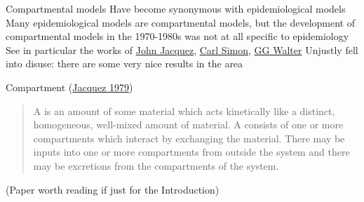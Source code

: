 \documentclass[aspectratio=169]{beamer}\usepackage[]{graphicx}\usepackage[]{xcolor}
\begin{document}
\begin{frame}{Compartmental models}
\bbullet Have become synonymous with epidemiological models
\vfill
\bbullet Many epidemiological models are compartmental models, but the development of compartmental models in the 1970-1980s was not at all specific to epidemiology
\vfill
\bbullet See in particular the works of \href{https://www.semanticscholar.org/author/J.-Jacquez/2321059}{John Jacquez}, \href{https://scholar.google.ca/citations?user=dv_z_mAAAAAJ}{Carl Simon}, \href{https://www.semanticscholar.org/author/G.-Walter/1799059}{GG Walter} \nocite{JacquezSimon1993}
\vfill
\bbullet Unjustly fell into disuse: there are some very nice results in the area    
\end{frame}

\begin{frame}{Compartment (\href{https://doi-org.uml.idm.oclc.org/10.1016/B978-0-12-434180-7.50021-8}{Jacquez 1979})}
\nocite{jacquez1979compartmental}

\begin{quote}
  A  is an amount of some material which acts kinetically like a distinct, homogeneous, well-mixed amount of material. A  consists of one or more compartments which interact by exchanging the material. There may be inputs into one or more compartments from outside the system and there may be excretions from the compartments of the system.   
\end{quote}
\vfill
(Paper worth reading if just for the Introduction)
\end{frame}
\end{document}
